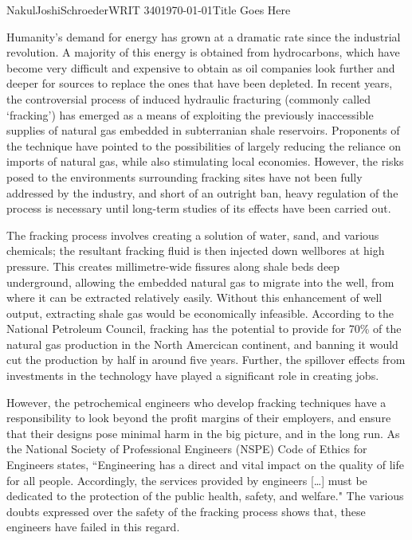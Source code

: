 \documentclass[12pt,letterpaper]{article}
\begin{document}
\begin{mla}{Nakul}{Joshi}{Schroeder}{WRIT 340}{\today}{Title Goes Here}

Humanity's demand for energy has grown at a dramatic rate since the industrial revolution. A majority of this energy is obtained from hydrocarbons, which have become very difficult and expensive to obtain as oil companies look further and deeper for sources to replace the ones that have been depleted. In recent years, the controversial process of induced hydraulic fracturing (commonly called `fracking') has emerged as a means of exploiting the previously inaccessible supplies of natural gas embedded in subterranian shale reservoirs. Proponents of the technique have pointed to the possibilities of largely reducing the reliance on imports of natural gas, while also stimulating local economies. However, the risks posed to the environments surrounding fracking sites have not been fully addressed by the industry, and short of an outright ban, heavy regulation of the process is necessary until long-term studies of its effects have been carried out.

The fracking process involves creating a solution of water, sand, and various chemicals; the resultant fracking fluid is then injected down wellbores at high pressure. This creates millimetre-wide fissures along shale beds deep underground, allowing the embedded natural gas to migrate into the well, from where it can be extracted relatively easily. Without this enhancement of well output, extracting shale gas would be economically infeasible. According to the National Petroleum Council, fracking has the potential to provide for 70\% of the natural gas production in the North Amercican continent, and banning it would cut the production by half in around five years. Further, the spillover effects from investments in the technology have played a significant role in creating jobs.

However, the petrochemical engineers who develop fracking techniques have a responsibility to look beyond the profit margins of their employers, and ensure that their designs pose minimal harm in the big picture, and in the long run. As the National Society of Professional Engineers (NSPE) Code of Ethics for Engineers states, ``Engineering has a direct and vital impact on the quality of life for all people. Accordingly, the services provided by engineers [\ldots] must be dedicated to the protection of the public health, safety, and welfare." The various doubts expressed over the safety of the fracking process shows that, these engineers have failed in this regard.


\end{mla}
\end{document}
